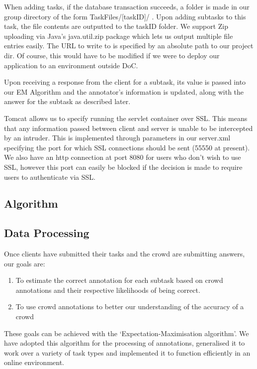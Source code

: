 \documentclass[11pt]{article}
\begin{document}
When adding tasks, if the database transaction succeeds, a folder is made in our group
directory of the form TaskFiles/[taskID]/ . Upon adding subtasks to this task, the
file contents are outputted to the taskID folder. We support Zip uploading via
Java's java.util.zip package which lets us output multiple file entries easily.
The URL to write to is specified by an absolute path to our project dir. Of course, this would
have to be modified if we were to deploy our application to an environment outside DoC.

Upon receiving a response from the client for a subtask, its value is passed into our
EM Algorithm and the annotator's information is updated, along with the answer for the
subtask as described later.

Tomcat allows us to specify running the servlet container over SSL. This means
that any information passed between client and server is unable to be intercepted
by an intruder. This is implemented through parameters in our server.xml specifying
the port for which SSL connections should be sent (55550 at present). We also have
an http connection at port 8080 for users who don't wish to use SSL, however this port can
easily be blocked if the decision is made to require users to authenticate via SSL.

\subsection{Algorithm}

\subsection{Data Processing}

Once clients have submitted their tasks and the crowd are submitting answers, our goals are:
\begin{enumerate}
\item To estimate the correct annotation for each subtask based on crowd annotations and their respective likelihoods of being correct.
\item To use crowd annotations to better our understanding of the accuracy of a crowd
\end{enumerate}

These goals can be achieved with the `Expectation-Maximisation algorithm'. We have adopted this algorithm for the processing of annotations, generalised it to work over a variety of task types and implemented it to function efficiently in an online environment.\\
\end{document}
